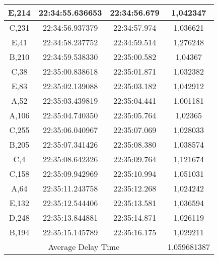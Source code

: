 \begin{table}[!h]
\begin{tabular}{|ccc|c|}
  \multicolumn{1}{|c|}{E,214} & \multicolumn{1}{c|}{22:34:55.636653} & 22:34:56.679       & 1,042347    \\ \hline
  \multicolumn{1}{|c|}{C,231} & \multicolumn{1}{c|}{22:34:56.937379} & 22:34:57.974       & 1,036621    \\ \hline
  \multicolumn{1}{|c|}{E,41}  & \multicolumn{1}{c|}{22:34:58.237752} & 22:34:59.514       & 1,276248    \\ \hline
  \multicolumn{1}{|c|}{B,210} & \multicolumn{1}{c|}{22:34:59.538330} & 22:35:00.582       & 1,04367     \\ \hline
  \multicolumn{1}{|c|}{C,38}  & \multicolumn{1}{c|}{22:35:00.838618} & 22:35:01.871       & 1,032382    \\ \hline
  \multicolumn{1}{|c|}{E,83}  & \multicolumn{1}{c|}{22:35:02.139088} & 22:35:03.182       & 1,042912    \\ \hline
  \multicolumn{1}{|c|}{A,52}  & \multicolumn{1}{c|}{22:35:03.439819} & 22:35:04.441       & 1,001181    \\ \hline
  \multicolumn{1}{|c|}{A,106} & \multicolumn{1}{c|}{22:35:04.740350} & 22:35:05.764       & 1,02365     \\ \hline
  \multicolumn{1}{|c|}{C,255} & \multicolumn{1}{c|}{22:35:06.040967} & 22:35:07.069       & 1,028033    \\ \hline
  \multicolumn{1}{|c|}{B,205} & \multicolumn{1}{c|}{22:35:07.341426} & 22:35:08.380       & 1,038574    \\ \hline
  \multicolumn{1}{|c|}{C,4}   & \multicolumn{1}{c|}{22:35:08.642326} & 22:35:09.764       & 1,121674    \\ \hline
  \multicolumn{1}{|c|}{C,158} & \multicolumn{1}{c|}{22:35:09.942969} & 22:35:10.994       & 1,051031    \\ \hline
  \multicolumn{1}{|c|}{A,64}  & \multicolumn{1}{c|}{22:35:11.243758} & 22:35:12.268       & 1,024242    \\ \hline
  \multicolumn{1}{|c|}{E,132} & \multicolumn{1}{c|}{22:35:12.544406} & 22:35:13.581       & 1,036594    \\ \hline
  \multicolumn{1}{|c|}{D,248} & \multicolumn{1}{c|}{22:35:13.844881} & 22:35:14.871       & 1,026119    \\ \hline
  \multicolumn{1}{|c|}{B,194} & \multicolumn{1}{c|}{22:35:15.145789} & 22:35:16.175       & 1,029211    \\ \hline
  \multicolumn{3}{|c|}{Average Delay Time}                                                & 1,059681387 \\ \hline
  \end{tabular}
\end{table}

